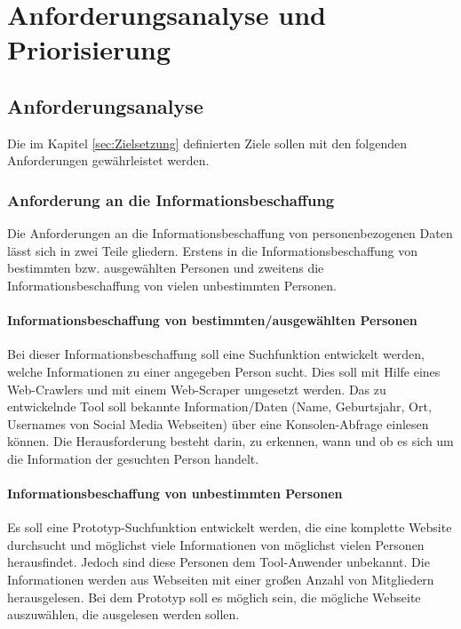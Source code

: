 
\chapter{Anforderungsanalyse und Priorisierung}  %
\label{cha:Anforderungsanalyse und Prioriesierung} %
\section{Anforderungsanalyse} %
\label{sec:Anforderunsanalyse} %
Die im Kapitel \ref{sec:Zielsetzung} definierten Ziele sollen mit den folgenden Anforderungen gewährleistet werden.

	\subsection{Anforderung an die Informationsbeschaffung}
	Die Anforderungen an die Informationsbeschaffung von personenbezogenen Daten lässt sich in zwei Teile gliedern. Erstens in die Informationsbeschaffung von bestimmten bzw. ausgewählten Personen und zweitens die Informationsbeschaffung von vielen unbestimmten Personen.
	
		\subsubsection{Informationsbeschaffung von bestimmten/ausgewählten Personen}
		Bei dieser Informationsbeschaffung soll eine Suchfunktion entwickelt werden, welche Informationen zu einer angegeben Person sucht. Dies soll mit Hilfe eines Web-Crawlers und mit einem Web-Scraper umgesetzt werden. Das zu entwickelnde Tool soll bekannte Information/Daten (Name, Geburtsjahr, Ort, Usernames von Social Media Webseiten) über eine Konsolen-Abfrage einlesen können. Die Herausforderung besteht darin, zu erkennen, wann und ob es sich um die Information der gesuchten Person handelt.
	
		\subsubsection{Informationsbeschaffung von unbestimmten Personen}
		Es soll eine Prototyp-Suchfunktion entwickelt werden, die eine komplette Website durchsucht und möglichst viele Informationen von möglichst vielen Personen herausfindet. Jedoch sind diese Personen dem Tool-Anwender unbekannt. Die Informationen werden aus Webseiten mit einer großen Anzahl von Mitgliedern herausgelesen. Bei dem Prototyp soll es möglich sein, die mögliche Webseite auszuwählen, die ausgelesen werden sollen.
		

